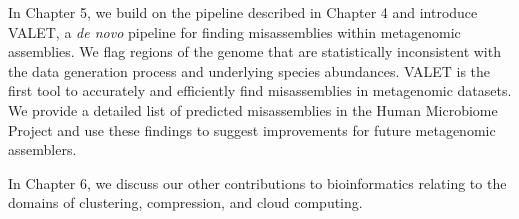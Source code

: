 In Chapter 5, we build on the pipeline described in Chapter 4 and introduce VALET, a \emph{de novo} pipeline for finding mis­assemblies within metagenomic assemblies.
We flag regions of the genome that are statistically inconsistent with the data generation process and underlying species abundances.
VALET is the first tool to accurately and efficiently find mis­assemblies in metagenomic datasets.
We provide a detailed list of predicted mis­assemblies in the Human Microbiome Project and use these findings to suggest improvements for future metagenomic assemblers.

In Chapter 6, we discuss our other contributions to bioinformatics relating to the domains of clustering, compression, and cloud computing.
